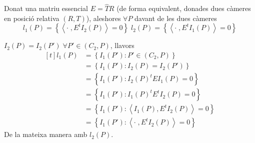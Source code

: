 \documentclass[a4paper,12pt]{article}
\begin{document}
	\begin{proposicio}
		Donat una matriu essencial $E = \hat{T}R$ (de forma equivalent, donades dues càmeres en posició relativa $(R,T)$), aleshores $\forall P$ davant de les dues càmeres
		\begin{displaymath}
			l_1(P) = \left\{\left\langle\cdot\;, E^tI_2(P)\right\rangle = 0\right\}\;
			l_2(P) = \left\{\left\langle\cdot\;, E^tI_1(P)\right\rangle = 0\right\}
		\end{displaymath}
	\end{proposicio}
	\begin{demostracio}
		$I_2(P) = I_2(P')\;\forall P' \in (C_2, P)$, llavors
		\begin{displaymath}
			\begin{aligned}[t]
				l_1(P) &= \left\{I_1(P') : P' \in (C_2, P)\right\}\\
			 	       &= \left\{I_1(P') : I_2(P) = I_2(P')\right\}\\
			 	       &= \left\{I_1(P') : I_2(P)^tEI_1(P)=0\right\}\\
			 	       &= \left\{I_1(P') : I_1(P)^tE^tI_2(P)=0\right\}\\
			 	       &= \left\{I_1(P') : \left\langle I_1(P),E^tI_2(P)\right\rangle=0\right\}\\
			 	       &= \left\{I_1(P') : \left\langle\cdot\;,E^tI_2(P)\right\rangle=0\right\}
			\end{aligned}
		\end{displaymath}
		De la mateixa manera amb $l_2(P)$.
	\end{demostracio}
\end{document}
